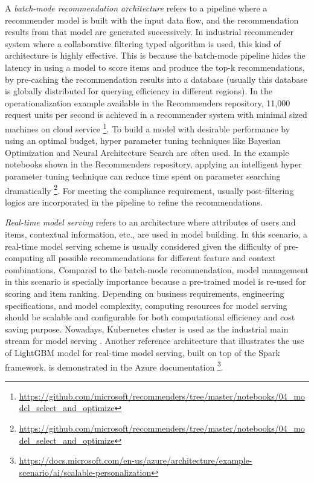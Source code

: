 A \textit{batch-mode recommendation architecture} refers to a pipeline where a recommender model is built with the input data flow, and the recommendation results from that model are generated successively. In industrial recommender system where a collaborative filtering typed algorithm is used, this kind of architecture is highly effective. This is because the batch-mode pipeline hides the latency in using a model to score items and produce the top-k recommendations, by pre-caching the recommendation results into a database (usually this database is globally distributed for querying efficiency in different regions). In the operationalization example available in the Recommenders repository, 11,000 request units per second is achieved in a recommender system with minimal sized machines on cloud service \footnote{\url{https://github.com/microsoft/recommenders/tree/master/notebooks/04_model_select_and_optimize}}. To build a model with desirable performance by using an optimal budget, hyper parameter tuning techniques like Bayesian Optimization \cite{snoek2012practical} and Neural Architecture Search \cite{zoph2016neural} are often used. In the example notebooks shown in the Recommenders repository, applying an intelligent hyper parameter tuning technique can reduce time spent on parameter searching dramatically \footnote{\url{https://github.com/microsoft/recommenders/tree/master/notebooks/04_model_select_and_optimize}}. For meeting the compliance requirement, usually post-filtering logics are incorporated in the pipeline to refine the recommendations.

\textit{Real-time model serving} refers to an architecture where attributes of users and items, contextual information, etc., are used in model building. In this scenario, a real-time model serving scheme is usually considered given the difficulty of pre-computing all possible recommendations for different feature and context combinations. Compared to the batch-mode recommendation, model management in this scenario is specially importance because a pre-trained model is re-used for scoring and item ranking. Depending on business requirements, engineering specifications, and model complexity, computing resources for model serving should be scalable and configurable for both computational efficiency and cost saving purpose. Nowadays, Kubernetes cluster is used as the industrial main stream for model serving \cite{bernstein2014containers}. Another reference architecture that illustrates the use of LightGBM model \cite{ke2017lightgbm} for real-time model serving, built on top of the Spark framework, is demonstrated in the Azure documentation \footnote{\url{https://docs.microsoft.com/en-us/azure/architecture/example-scenario/ai/scalable-personalization}}.
